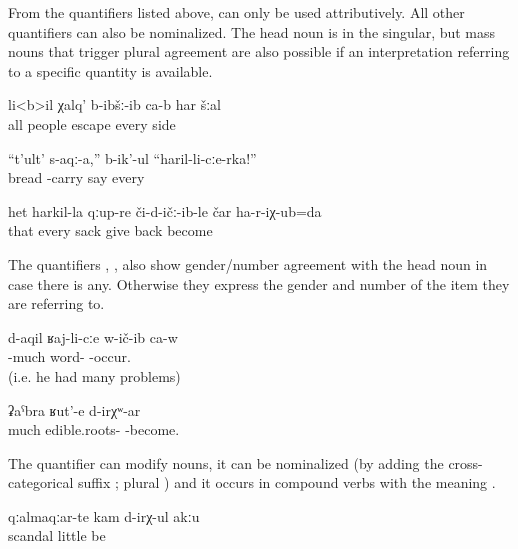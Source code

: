 From the quantifiers listed above,  can only be used attributively. All other quantifiers can also be nominalized. The head noun is in the singular, but mass nouns that trigger plural agreement are also possible if an interpretation referring to a specific quantity is available.
%
\begin{exe}
	\ex	\label{ex:All people escaped in every direction}
	\gll	li<b>il	χalq'	b-ibšː-ib ca-b	har	šːal\\
		all	people	escape 	every	side\\
	\glt	{}

	\ex	\label{ex:Bring bread from everyone}
	\gll	``t'ult'	s-aqː-a,''	b-ik'-ul		``haril-li-cːe-rka!''\\
		bread	-carry	say	every\\
	\glt	{}

	\ex	\label{ex:I (fem.) gave everyone's sack back and came back}
	\gll	het	harkil-la	qːup-re	či-d-ičː-ib-le						čar ha-r-iχ-ub=da\\
		that	every	sack	give	back become\\
	\glt	{}
\end{exe}

The quantifiers , ,   also show gender/number agreement with the head noun in case there is any. Otherwise they express the gender and number of the item they are referring to.
%
\begin{exe}
	\ex	\label{ex:He took part in many arguments}
	\gll	d-aqil	ʁaj-li-cːe	w-ič-ib ca-w\\
		-much	word-	-occur. \\
	\glt	{} (i.e. he had many problems)

	\ex	\label{ex:There are many edible roots}
	\gll	ʡaˁbra	ʁut'-e	d-irχʷ-ar\\
		much	edible.roots-	-become.\\
	\glt	{}
\end{exe}

The quantifier   can modify nouns, it can be nominalized (by adding the cross-categorical suffix ; plural  ) and it occurs in compound verbs with the meaning  .
%
\begin{exe}
	\ex	\label{ex:The scandals (i.e. fights) did not diminish}
	\gll	qːalmaqːar-te	kam	d-irχ-ul	akːu\\
		scandal	little	be	\\
	\glt	{}
\end{exe}


